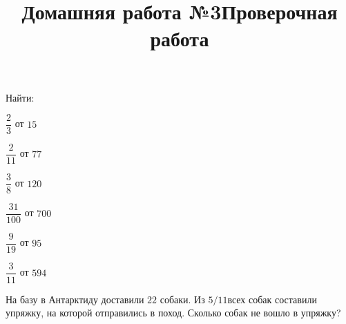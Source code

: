 \newpage
\title{Домашняя работа №3}
\begin{listofex}
	\item Найти:
	\begin{enumcols}[itemcolumns=3]
		\item \( \dfrac{2}{3} \) от \( 15 \)
		\item \( \dfrac{2}{11} \) от \( 77 \)
		\item \( \dfrac{3}{8} \) от \( 120 \)
		\item \( \dfrac{31}{100} \) от \( 700 \)
		\item \( \dfrac{9}{19} \) от \( 95 \)
		\item \( \dfrac{3}{11} \) от \( 594 \)
	\end{enumcols}
	\item На базу в Антарктиду доставили \( 22 \) собаки. Из \( 5/11 \)всех собак составили упряжку, на
	которой отправились в поход. Сколько собак не вошло в упряжку?
\end{listofex}
\newpage
\title{Проверочная работа}
